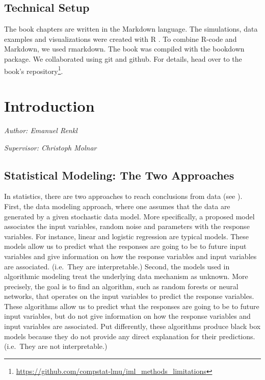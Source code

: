 \documentclass[]{krantz}
\renewcommand{\href}[2]{#2\footnote{\url{#1}}}
\begin{document}
\section*{Technical Setup}\label{technical-setup}


The book chapters are written in the Markdown language. The simulations,
data examples and visualizations were created with R \citep{rlang}. To
combine R-code and Markdown, we used rmarkdown. The book was compiled
with the bookdown package. We collaborated using git and github. For
details, head over to the
\href{https://github.com/compstat-lmu/iml_methods_limitations}{book's
repository}.

\chapter{Introduction}\label{introduction}

\emph{Author: Emanuel Renkl}

\emph{Supervisor: Christoph Molnar}

\section{Statistical Modeling: The Two
Approaches}\label{statistical-modeling-the-two-approaches}

In statistics, there are two approaches to reach conclusions from data
(see \citet{breiman2001}). First, the data modeling approach, where one
assumes that the data are generated by a given stochastic data model.
More specifically, a proposed model associates the input variables,
random noise and parameters with the response variables. For instance,
linear and logistic regression are typical models. These models allow us
to predict what the responses are going to be to future input variables
and give information on how the response variables and input variables
are associated. (i.e.~They are interpretable.) Second, the models used
in algorithmic modeling treat the underlying data mechanism as unknown.
More precisely, the goal is to find an algorithm, such as random forests
or neural networks, that operates on the input variables to predict the
response variables. These algorithms allow us to predict what the
responses are going to be to future input variables, but do not give
information on how the response variables and input variables are
associated. Put differently, these algorithms produce black box models
because they do not provide any direct explanation for their
predictions. (i.e.~They are not interpretable.)
\end{document}
